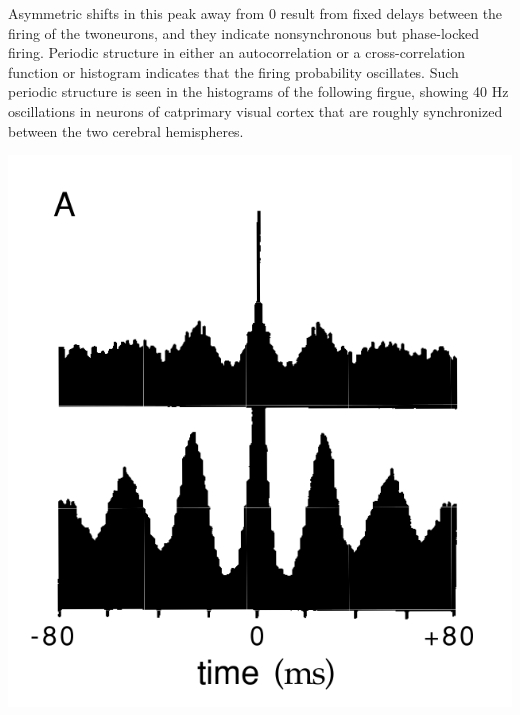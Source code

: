 \begin{exm}
    Asymmetric shifts in this peak away from 0 result from fixed delays between the firing of the twoneurons, and they indicate nonsynchronous but phase-locked firing.    
    Periodic structure in either an autocorrelation or a cross-correlation function or histogram indicates that the firing probability oscillates. Such periodic structure is seen in the histograms of the following firgue, showing 40 Hz oscillations in neurons of catprimary visual cortex that are roughly synchronized between the two cerebral hemispheres.
\end{exm}
\begin{center}
    \label{fig:1.12A}    
    \includegraphics[scale = 0.36]{png/Figure1-12-A.png}
    \label{fig:1.12B} 

\end{center}
